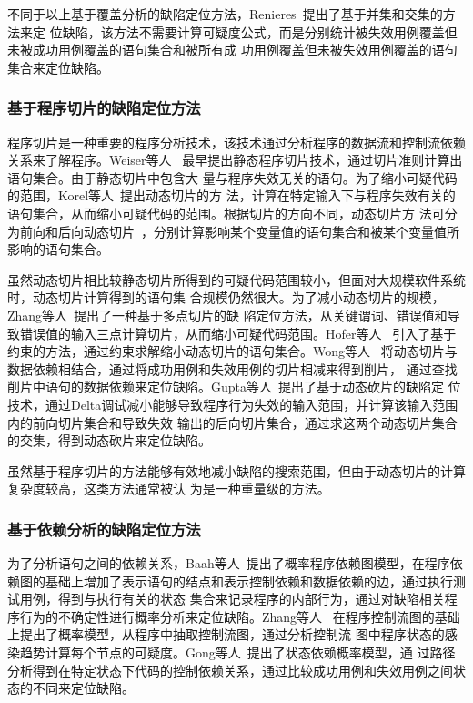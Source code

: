 不同于以上基于覆盖分析的缺陷定位方法，Renieres~\cite{renieres2003fault}提出了基于并集和交集的方法来定
位缺陷，该方法不需要计算可疑度公式，而是分别统计被失效用例覆盖但未被成功用例覆盖的语句集合和被所有成
功用例覆盖但未被失效用例覆盖的语句集合来定位缺陷。

\subsubsection{基于程序切片的缺陷定位方法}
程序切片是一种重要的程序分析技术，该技术通过分析程序的数据流和控制流依赖关系来了解程序。Weiser等人
~\cite{weiser1981program}最早提出静态程序切片技术，通过切片准则计算出语句集合。由于静态切片中包含大
量与程序失效无关的语句。为了缩小可疑代码的范围，Korel等人~\cite{korel1988dynamic}提出动态切片的方
法，计算在特定输入下与程序失效有关的语句集合，从而缩小可疑代码的范围。根据切片的方向不同，动态切片方
法可分为前向和后向动态切片~\cite{korel1994forward}，分别计算影响某个变量值的语句集合和被某个变量值所
影响的语句集合。

虽然动态切片相比较静态切片所得到的可疑代码范围较小，但面对大规模软件系统时，动态切片计算得到的语句集
合规模仍然很大。为了减小动态切片的规模，Zhang等人~\cite{zhang2007locating}提出了一种基于多点切片的缺
陷定位方法，从关键谓词、错误值和导致错误值的输入三点计算切片，从而缩小可疑代码范围。Hofer等人
~\cite{hofer2012combining}引入了基于约束的方法，通过约束求解缩小动态切片的语句集合。Wong等人
~\cite{wong2004execution}将动态切片与数据依赖相结合，通过将成功用例和失效用例的切片相减来得到削片，
通过查找削片中语句的数据依赖来定位缺陷。Gupta等人~\cite{gupta2005locating}提出了基于动态砍片的缺陷定
位技术，通过Delta调试减小能够导致程序行为失效的输入范围，并计算该输入范围内的前向切片集合和导致失效
输出的后向切片集合，通过求这两个动态切片集合的交集，得到动态砍片来定位缺陷。

虽然基于程序切片的方法能够有效地减小缺陷的搜索范围，但由于动态切片的计算复杂度较高，这类方法通常被认
为是一种重量级的方法。

\subsubsection{基于依赖分析的缺陷定位方法}

为了分析语句之间的依赖关系，Baah等人~\cite{baah2010probabilistic}提出了概率程序依赖图模型，在程序依
赖图的基础上增加了表示语句的结点和表示控制依赖和数据依赖的边，通过执行测试用例，得到与执行有关的状态
集合来记录程序的内部行为，通过对缺陷相关程序行为的不确定性进行概率分析来定位缺陷。Zhang等人
~\cite{zhang2009capturing}在程序控制流图的基础上提出了概率模型，从程序中抽取控制流图，通过分析控制流
图中程序状态的感染趋势计算每个节点的可疑度。Gong等人~\cite{gong2015state}提出了状态依赖概率模型，通
过路径分析得到在特定状态下代码的控制依赖关系，通过比较成功用例和失效用例之间状态的不同来定位缺陷。

